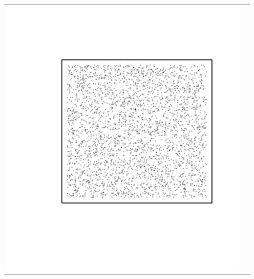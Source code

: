 \documentclass{article}\usepackage{graphicx, color}
\makeatletter
\def\maxwidth{ %
  \ifdim\Gin@nat@width>\linewidth
    \linewidth
  \else
    \Gin@nat@width
  \fi
}
\newenvironment{knitrout}{}{} %
\makeatother
\begin{document}
\vspace*{-1.75in}
\begin{tabular}{cc}
\begin{knitrout}
\definecolor{shadecolor}{rgb}{0.969, 0.969, 0.969}\color{fgcolor}\includegraphics[width=\maxwidth]{figure/unnamed-chunk-31} 
\end{knitrout}


\end{tabular}
\end{document}
